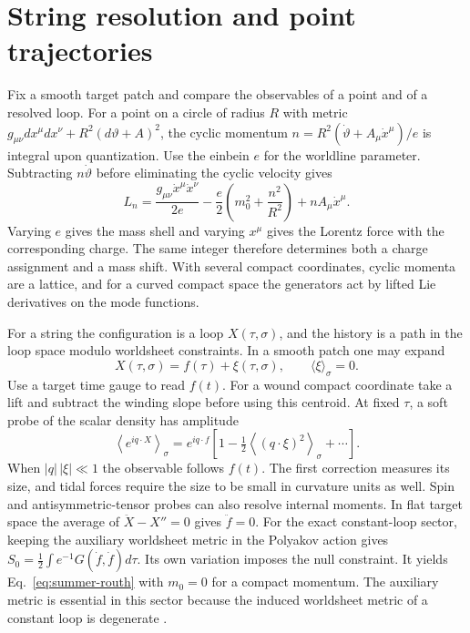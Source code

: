 \documentclass[10pt]{article}
\theoremstyle{definition}
\begin{document}
\section{String resolution and point trajectories}

Fix a smooth target patch and compare the observables of a point and of a resolved loop. For a point on a circle of radius \(R\) with metric \(g_{\mu\nu}dx^\mu dx^\nu+R^2(d\vartheta+A)^2\), the cyclic momentum \(n=R^2(\dot\vartheta+A_\mu\dot x^\mu)/e\) is integral upon quantization. Use the einbein \(e\) for the worldline parameter. Subtracting \(n\dot\vartheta\) before eliminating the cyclic velocity gives
\begin{equation}
 L_n=\frac{g_{\mu\nu}\dot x^\mu\dot x^\nu}{2e}
       -\frac e2\left(m_0^2+\frac{n^2}{R^2}\right)
       +n A_\mu\dot x^\mu .
 \label{eq:summer-routh}
\end{equation}
Varying \(e\) gives the mass shell and varying \(x^\mu\) gives the Lorentz force with the corresponding charge. The same integer therefore determines both a charge assignment and a mass shift. With several compact coordinates, cyclic momenta are a lattice, and for a curved compact space the generators act by lifted Lie derivatives on the mode functions.

For a string the configuration is a loop \(X(\tau,\sigma)\), and the history is a path in the loop space modulo worldsheet constraints. In a smooth patch one may expand
\begin{equation}
 X(\tau,\sigma)=f(\tau)+\xi(\tau,\sigma),\qquad
 \langle \xi\rangle_\sigma=0 .
\end{equation}
Use a target time gauge to read \(f(t)\). For a wound compact coordinate take a lift and subtract the winding slope before using this centroid. At fixed \(\tau\), a soft probe of the scalar density has amplitude
\begin{equation}
 \left\langle e^{iq\cdot X}\right\rangle_\sigma
 =e^{iq\cdot f}\left[1-\tfrac12
          \left\langle(q\cdot\xi)^2\right\rangle_\sigma+\cdots\right].
 \label{eq:summer-probe}
\end{equation}
When \(|q|\,|\xi|\ll1\) the observable follows \(f(t)\). The first correction measures its size, and tidal forces require the size to be small in curvature units as well. Spin and antisymmetric-tensor probes can also resolve internal moments. In flat target space the average of \(\ddot X-X''=0\) gives \(\ddot f=0\). For the exact constant-loop sector, keeping the auxiliary worldsheet metric in the Polyakov action gives \(S_0=\frac12\int e^{-1}G(\dot f,\dot f)d\tau\). Its own variation imposes the null constraint. It yields Eq.~\eqref{eq:summer-routh} with \(m_0=0\) for a compact momentum. The auxiliary metric is essential in this sector because the induced worldsheet metric of a constant loop is degenerate \cite{Polyakov1981Worldsheet,Polchinski1998String}.
\end{document}
